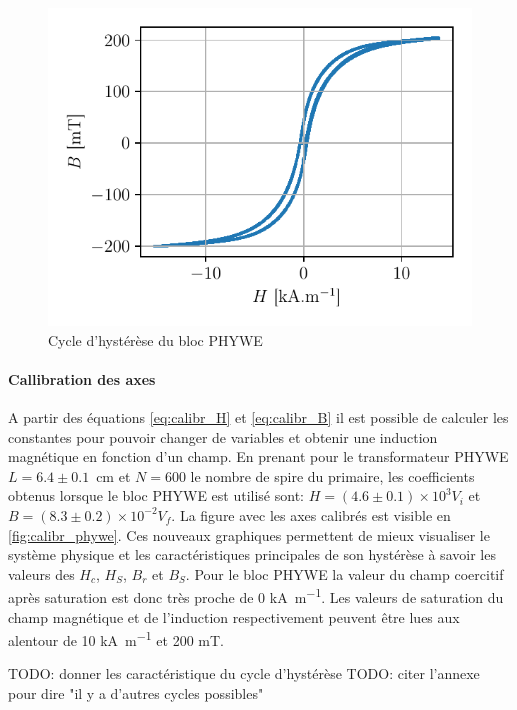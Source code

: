\begin{minipage}{\linewidth}
    \begin{figure}
        \includegraphics[width=\linewidth]{figures/G1-phywe-avec-bloc_chang.pdf}
        \caption{Cycle d'hystérèse du bloc PHYWE}
        \label{fig:calibr_phywe}
    \end{figure}

    \paragraph{Callibration des axes}
    A partir des équations \autoref{eq:calibr_H} et \autoref{eq:calibr_B} il est possible de calculer les constantes pour pouvoir changer de variables et obtenir une induction magnétique en fonction d'un champ. En prenant pour le transformateur PHYWE \hbox{\(L = 6.4 \pm 0.1\) \si{\centi \meter}} et \(N = 600\) le nombre de spire du primaire, les coefficients obtenus lorsque le bloc PHYWE est utilisé sont: \hbox{\(H = (4.6\pm0.1)\times10^3 V_i\)} et \hbox{\(B = (8.3\pm0.2)\times10^{-2} V_f\)}. La figure avec les axes calibrés est visible en \autoref{fig:calibr_phywe}.
    Ces nouveaux graphiques permettent de mieux visualiser le système physique et les caractéristiques principales de son hystérèse à savoir les valeurs des \(H_c\), \(H_S\), \(B_r\) et \(B_S\). Pour le bloc PHYWE la valeur du champ coercitif après saturation est donc très proche de 0 \si{\kilo\ampere\per\meter}. Les valeurs de saturation  du champ magnétique et de l'induction respectivement peuvent être lues aux alentour de 10 \si{\kilo\ampere\per\meter} et 200 \si{\milli\tesla}.

    TODO: donner les caractéristique du cycle d'hystérèse
    TODO: citer l'annexe pour dire "il y a d'autres cycles possibles"
\end{minipage}

